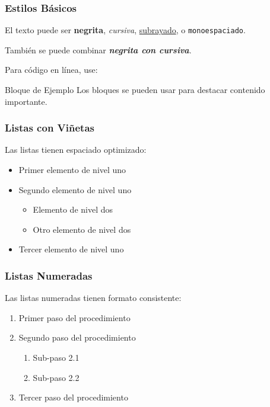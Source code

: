 \documentclass{pt-slides}
\begin{document}
\begin{frame}
    \frametitle{Estilos Básicos}

    El texto puede ser \textbf{negrita}, \textit{cursiva}, \underline{subrayado}, o \texttt{monoespaciado}.

    \vspace{0.5cm}

    También se puede combinar \textbf{\textit{negrita con cursiva}}.

    \vspace{0.5cm}

    Para código en línea, use: 

    \vspace{0.5cm}

    \begin{block}{Bloque de Ejemplo}
        Los bloques se pueden usar para destacar contenido importante.
    \end{block}
\end{frame}

\begin{frame}
    \frametitle{Listas con Viñetas}

    Las listas tienen espaciado optimizado:

    \begin{itemize}
        \item Primer elemento de nivel uno
        \item Segundo elemento de nivel uno
              \begin{itemize}
                  \item Elemento de nivel dos
                  \item Otro elemento de nivel dos
              \end{itemize}
        \item Tercer elemento de nivel uno
    \end{itemize}
\end{frame}

\begin{frame}
    \frametitle{Listas Numeradas}

    Las listas numeradas tienen formato consistente:

    \begin{enumerate}
        \item Primer paso del procedimiento
        \item Segundo paso del procedimiento
              \begin{enumerate}
                  \item Sub-paso 2.1
                  \item Sub-paso 2.2
              \end{enumerate}
        \item Tercer paso del procedimiento
    \end{enumerate}
\end{frame}
\end{document}
